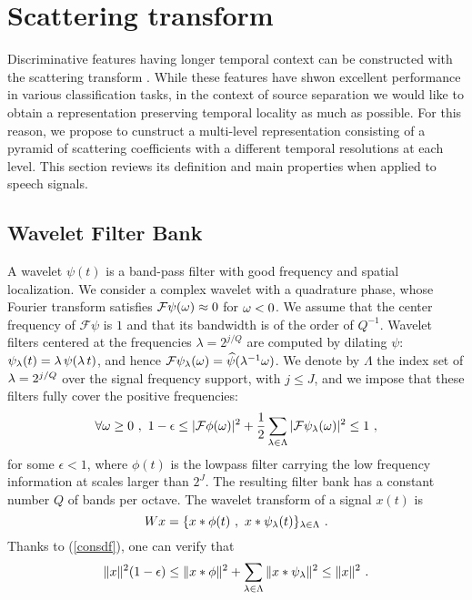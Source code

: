 \section{Scattering transform}
\label{scattsec}

Discriminative features having longer temporal context can be constructed with the 
scattering transform \cite{deepscatt,pami}. 
While these features have shwon excellent performance in various classification tasks, 
in the context of source separation we would like to obtain a representation 
preserving temporal locality as much as possible.
For this reason, we propose to cunstruct a multi-level representation consisting of a pyramid of scattering coefficients 
with a different temporal resolutions at each level. 
This section reviews its definition and main properties when applied to speech signals.

\subsection{Wavelet Filter Bank}

A wavelet $\psi (t)$ is a band-pass filter with good frequency and spatial localization.
 We consider a complex wavelet with a quadrature phase, 
whose Fourier transform satisfies
$\mathcal{F} \psi({\omega}) \approx 0$ for ${\omega} < 0$.
We assume that the center frequency of $\mathcal{F} \psi$ is $1$ and 
that its bandwidth is of the order of $Q^{-1}$. 
Wavelet filters centered
at the frequencies $\lambda = 2^{j/Q}$ are computed by dilating $\psi$:
$\psi_{\lambda} (t) = {\lambda}\, \psi({\lambda}\, t)$, and hence $\mathcal{F} \psi_{\lambda} ({\omega}) = \widehat \psi({\lambda}^{-1} \omega)$.
We denote by $\Lambda$ the index set of ${\lambda} = 2^{j/Q}$ over
the signal frequency support, with $j \leq J$, 
and we impose that these filters fully cover the positive frequencies:
\begin{equation}
\label{consdf}
\forall {\omega} \geq 0~,~ 1- \epsilon 
\leq |\mathcal{F}{\phi}(\omega)|^2 + \frac 1 2 \sum_{{\lambda} \in \Lambda} |\mathcal{F}{\psi}_{\lambda}(\omega)|^2 \leq 1~,
\end{equation}
for some $\epsilon <1$, where $\phi(t)$ is the lowpass filter carrying the 
low frequency information at scales larger than $2^J$.
The resulting filter bank has a constant number $Q$ of bands per 
octave. The wavelet transform of a signal $x(t)$ is
\[
W x = \{x \ast \phi(t)~,~x \ast \psi_{\lambda}(t)  \}_{{\lambda} \in \Lambda}~.
\]
Thanks to (\ref{consdf}), one can verify that 
\begin{equation}
\label{lp_basic}
\| x \|^2 (1- \epsilon) \leq \| x \ast \phi \|^2 + \sum_{{\lambda} \in \Lambda} \| x \ast \psi_{\lambda} \|^2  \leq \| x \|^2~.
\end{equation}

